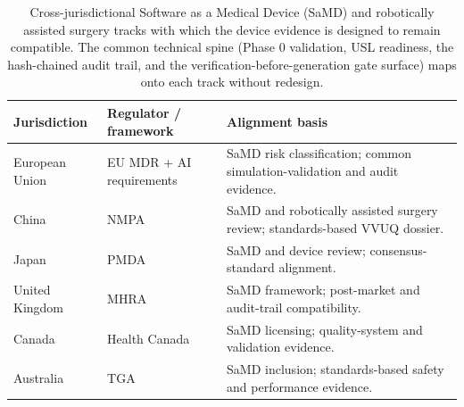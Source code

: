 \begin{table}[htbp]
\centering
\footnotesize
\caption{Cross-jurisdictional Software as a Medical Device (SaMD) and robotically
assisted surgery tracks with which the device evidence is designed to remain
compatible. The common technical spine (Phase 0 validation, USL readiness, the
hash-chained audit trail, and the verification-before-generation gate surface)
maps onto each track without redesign.}
\label{tab:jurisdictions}
\begin{tabularx}{\textwidth}{L{3.2cm} L{3.4cm} Y}
\toprule
\textbf{Jurisdiction} & \textbf{Regulator / framework} & \textbf{Alignment basis} \\
\midrule
European Union & EU MDR + AI requirements & SaMD risk classification; common simulation-validation and audit evidence. \\
China & NMPA & SaMD and robotically assisted surgery review; standards-based VVUQ dossier. \\
Japan & PMDA & SaMD and device review; consensus-standard alignment. \\
United Kingdom & MHRA & SaMD framework; post-market and audit-trail compatibility. \\
Canada & Health Canada & SaMD licensing; quality-system and validation evidence. \\
Australia & TGA & SaMD inclusion; standards-based safety and performance evidence. \\
\bottomrule
\end{tabularx}
\end{table}

